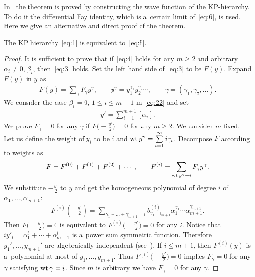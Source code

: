 \documentclass[pdftex]{sigma}
\begin{document}
In~\cite{TT1} the theorem is proved by constructing the wave function of the KP-hierarchy.
To do it the dif\/ferential Fay identity, which is a~certain limit of~\eqref{eq:6}, is used.
Here we give an alternative and direct proof of the theorem.
\begin{proposition}\label{proposition1}
The KP hierarchy~\eqref{eq:1} is equivalent to~\eqref{eq:5}.
\end{proposition}
\begin{proof}
It is suf\/f\/icient to prove that if~\eqref{eq:4} holds for any $m\ge2$ and arbitrary
$\alpha_i\neq0$, $\beta_i$, then~\eqref{eq:3} holds.
Set the left hand side of~\eqref{eq:3} to be $F(y)$.
Expand $F(y)$ in $y$ as
\begin{gather*}%
F(y)=\sum_\gamma F_\gamma y^\gamma,\qquad  y^\gamma=y_1^{\gamma_1}y_2^{\gamma_2}
\cdots,\qquad \gamma=(\gamma_1,\gamma_2,\dots).
\end{gather*}
We consider the case $\beta_i=0$, $1\le i\le m-1$ in~\eqref{eq:22} and set
\begin{gather*}%
y'=\sum_{i=1}^{m+1}[\alpha_i].
\end{gather*}
We prove $F_\gamma=0$ for any $\gamma$ if $F\big({-}\frac{y'}{2}\big)=0$ for any $m\ge2$.
We consider $m$ f\/ixed.
Let us def\/ine the weight of $y_i$ to be $i$ and ${\rm wt}\,y^\gamma=\sum\limits_{i=1}^{\infty}i\gamma_i$.
Decompose $F$ according to weights as
\begin{gather*}
F=F^{(0)}+F^{(1)}+F^{(2)}+\cdots,
\qquad
F^{(i)}=\sum_{{\rm wt}\,y^\gamma=i}F_\gamma y^\gamma.
\end{gather*}
We substitute $-\frac{y'}{2}$ to $y$ and get the homogeneous polynomial of degree $i$ of
$\alpha_1,\dots,\alpha_{m+1}$:
\begin{gather*}%
F^{(i)}\left(-\frac{y'}{2}\right)=\sum_{\gamma_1+\dots+\gamma_{m+1}=i}b^{(i)}_{\gamma_1\dots\gamma_{m+1}}
\alpha_1^{\gamma_1}\cdots\alpha_{m+1}^{\gamma_{m+1}}.
\end{gather*}
Then $F\big({-}\frac{y'}{2}\big)=0$ is equivalent to $F^{(i)}\big({-}\frac{y'}{2}\big)=0$ for any $i$.
Notice that $i y'_i=\alpha_1^i+\cdots+\alpha_{m+1}^i$ is a~power sum symmetric function.
Therefore $y_1',\dots,y_{m+1}'$ are algebraically independent (see~\cite[(2.12)]{Mac}).
If $i\le m+1$, then $F^{(i)}(y)$ is a~polynomial at most of $y_1,\dots,y_{m+1}$.
Thus $F^{(i)}\big({-}\frac{y'}{2}\big)=0$ implies $F_\gamma=0$ for any $\gamma$ satisfying ${\rm wt}\,\gamma=i$.
Since $m$ is arbitrary we have $F_\gamma=0$ for any $\gamma$.
\end{proof}
\end{document}
